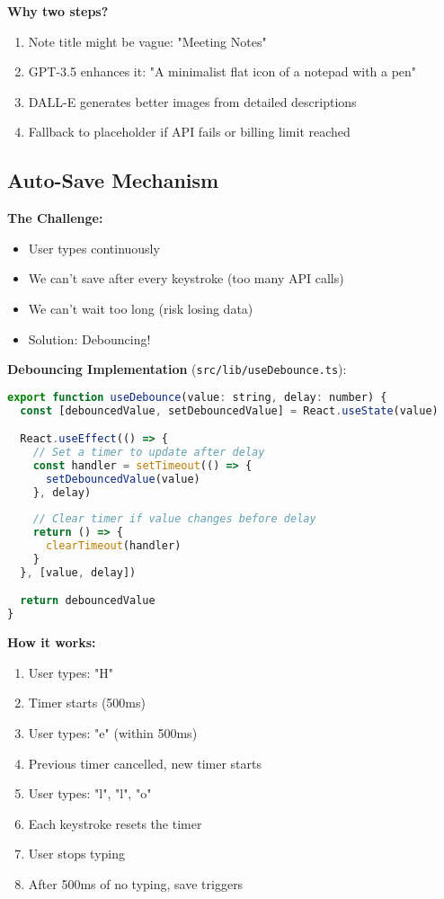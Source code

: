 \documentclass[11pt,a4paper]{article}
\begin{document}
\textbf{Why two steps?}
\begin{enumerate}
    \item Note title might be vague: "Meeting Notes"
    \item GPT-3.5 enhances it: "A minimalist flat icon of a notepad with a pen"
    \item DALL-E generates better images from detailed descriptions
    \item Fallback to placeholder if API fails or billing limit reached
\end{enumerate}


\subsection{Auto-Save Mechanism}

\textbf{The Challenge:}
\begin{itemize}
    \item User types continuously
    \item We can't save after every keystroke (too many API calls)
    \item We can't wait too long (risk losing data)
    \item Solution: Debouncing!
\end{itemize}

\textbf{Debouncing Implementation} (\texttt{src/lib/useDebounce.ts}):

\begin{lstlisting}[language=JavaScript]
export function useDebounce(value: string, delay: number) {
  const [debouncedValue, setDebouncedValue] = React.useState(value)

  React.useEffect(() => {
    // Set a timer to update after delay
    const handler = setTimeout(() => {
      setDebouncedValue(value)
    }, delay)
    
    // Clear timer if value changes before delay
    return () => {
      clearTimeout(handler)
    }
  }, [value, delay])

  return debouncedValue
}
\end{lstlisting}

\textbf{How it works:}
\begin{enumerate}
    \item User types: "H"
    \item Timer starts (500ms)
    \item User types: "e" (within 500ms)
    \item Previous timer cancelled, new timer starts
    \item User types: "l", "l", "o"
    \item Each keystroke resets the timer
    \item User stops typing
    \item After 500ms of no typing, save triggers
\end{enumerate}
\end{document}
